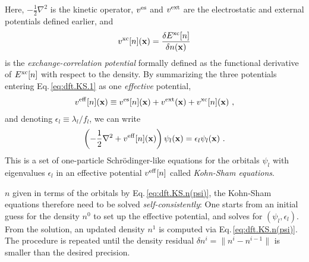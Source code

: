 Here, $-\frac{1}{2} \nabla^2$ is the kinetic operator, $v^{\rm es}$ and $v^{\rm ext}$ are the electrostatic and external potentials defined earlier, and
\begin{align}
	v^{\rm xc} [n] ({\bf x})
		= \frac{\delta E^{\rm xc}[n]}{\delta n ({\bf x})}
	\label{eq:dft.vxc}
\end{align}
is the \emph{exchange-correlation potential} formally defined as the functional derivative of $E^{\rm xc} [n]$ with respect to the density. By summarizing the three potentials entering Eq.\,\eqref{eq:dft.KS.1} as one \emph{effective} potential,
\begin{align}
	v^{\rm eff} [n] ({\bf x})
	\equiv
		v^{\rm es} [n] ({\bf x})
		+ v^{\rm ext}  ({\bf x})
		+ v^{\rm xc} [n] ({\bf x})~,
	\label{eq:dft.KS.veff}
\end{align}
 and denoting $\epsilon_l \equiv \lambda_l / f_l$, we can write
\begin{align}
	\left(
		-\frac{1}{2} \nabla^2 
		+ v^{\rm eff} [n] ({\bf x})
	\right) \psi_l ({\bf x})
	= \epsilon_l \psi_l ({\bf x})~.
\label{eq:dft.KS.2}
\end{align}
This is a set of one-particle Schr\"odinger-like equations for the orbitals $\psi_l$ with eigenvalues $\epsilon_l$ in an effective potential $v^{\rm eff}[n]$ called \emph{Kohn-Sham equations}.


 $n$ given in terms of the orbitals by Eq.\,\eqref{eq:dft.KS.n(psi)}, the Kohn-Sham equations therefore need to be solved \emph{self-consistently}: One starts from an initial guess for the density $n^0$ to set up the effective potential, and solves for $(\psi_l, \epsilon_l)$. From the solution, an updated density $n^1$ is computed via Eq.\,\eqref{eq:dft.KS.n(psi)}. The procedure is repeated until the density residual $\delta n^i = \lVert n^i - n^{i-1} \rVert$ is smaller than the desired precision. 


